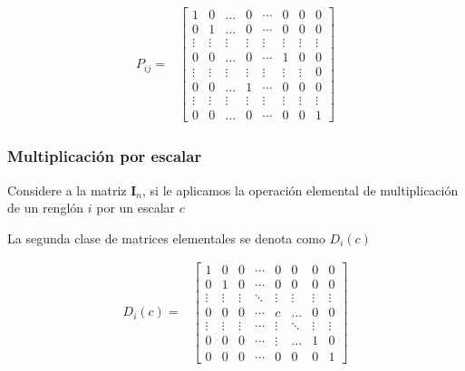 \documentclass[
]{article}
\begin{document}
\begin{equation*}
\begin{array}{cr}
P_{ij} = &  \begin{bmatrix} 
               1      & 0     & \ldots  & 0     & \cdots  & 0      & 0       & 0      \\ 
               0      & 1     & \ldots  & 0     & \cdots  & 0      & 0       & 0      \\
            \vdots    & \vdots& \vdots  & \vdots& \vdots  & \vdots & \vdots  & \vdots \\
               0      &  0    & \ldots  & 0     & \cdots  & 1      & 0       & 0      \\
             \vdots   & \vdots& \vdots  & \vdots& \vdots  & \vdots & \vdots  & 0      \\
              0       &  0    & \ldots  & 1     & \cdots  & 0      & 0       & 0      \\
               \vdots & \vdots& \vdots  & \vdots& \vdots  & \vdots & \vdots  & \vdots \\
              0       &  0    & \ldots  & 0     & \cdots  & 0      & 0       & 1
  \end{bmatrix}
\end{array}
\end{equation*}

\hypertarget{multiplicaciuxf3n-por-escalar}{%
\subsubsection{Multiplicación por
escalar}\label{multiplicaciuxf3n-por-escalar}}

Considere a la matriz \(\mathbf{I}_n\), si le aplicamos la operación
elemental de multiplicación de un renglón \(i\) por un escalar \(c\)

La segunda clase de matrices elementales se denota como \(D_{i}(c)\)

\begin{equation*}
\begin{array}{cc}
D_{i}(c) = &  \begin{bmatrix} 
     1     & 0      & 0     & \cdots   & 0       & 0      & 0       & 0      \\ 
     0     & 1      & 0     & \cdots   & 0       & 0      & 0       & 0      \\
 \vdots    & \vdots &\vdots & \ddots   & \vdots  & \vdots & \vdots  & \vdots \\
     0     &  0     & 0     & \cdots   & c       & \ldots & 0       & 0      \\
    \vdots & \vdots & \vdots& \cdots   & \vdots  & \ddots & \vdots  & \vdots \\
     0     &  0     & 0     & \cdots   &  \vdots & \ldots &  1      & 0 \\
     0     &  0     & 0    & \cdots    & 0       &  0     &  0      & 1
  \end{bmatrix}
\end{array}
\end{equation*}
\end{document}
